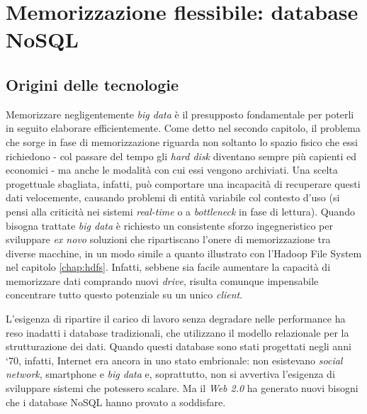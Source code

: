 \chapter{Memorizzazione flessibile: database NoSQL}
\label{chap:nosql}

\section{Origini delle tecnologie}

Memorizzare negligentemente \textit{big data} è il presupposto fondamentale per poterli in seguito elaborare efficientemente. Come detto nel secondo capitolo, il problema che sorge
in fase di memorizzazione riguarda non soltanto lo spazio fisico che essi richiedono - col passare del tempo gli \textit{hard disk} diventano sempre più capienti ed economici - ma 
anche le modalità con cui essi vengono archiviati. Una scelta progettuale sbagliata, infatti, può comportare una incapacità di recuperare questi dati velocemente, causando 
problemi di entità variabile col contesto d’uso (si pensi alla criticità nei sistemi \textit{real-time} o a \textit{bottleneck} in fase di lettura). Quando bisogna trattate \textit{big data} è richiesto 
un consistente sforzo ingegneristico per sviluppare \textit{ex novo} soluzioni che ripartiscano l’onere di memorizzazione tra diverse macchine, in un modo simile a quanto illustrato 
con l’Hadoop File System nel capitolo \ref{chap:hdfs}. Infatti, sebbene sia facile aumentare la capacità di memorizzare dati comprando nuovi \textit{drive}, risulta comunque impensabile concentrare
tutto questo potenziale su un unico \textit{client}.

L’esigenza di ripartire il carico di lavoro senza degradare nelle performance ha reso inadatti i database tradizionali, che utilizzano il modello relazionale per la strutturazione
dei dati. Quando questi database sono stati progettati negli anni ‘70, infatti, Internet era ancora in uno stato embrionale: non esistevano \textit{social network}, smartphone e \textit{big data}
e, soprattutto, non si avvertiva l’esigenza di sviluppare sistemi che potessero scalare. Ma il \textit{Web 2.0} ha generato nuovi bisogni che i database NoSQL hanno provato a soddisfare.

